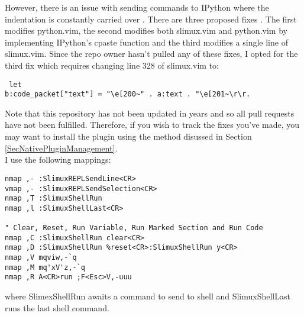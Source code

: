 \documentclass[10pt]{article}
\begin{document}
However, there is an issue with sending commands to IPython where the
indentation is constantly carried over \cite{kmARC2015indentationerror}. There
are three proposed fixes
\cite{lotabout2017remove,karadaharu2016add,zcesur2018fix}. The first modifies
python.vim, the second modifies both slimux.vim and python.vim by implementing
IPython's cpaste function and the third modifies a single line of slimux.vim.
Since the repo owner hasn't pulled any of these fixes, I opted for the third fix
which requires changing line 328 of slimux.vim to: 
\begin{lstlisting} let
b:code_packet["text"] = "\e[200~" . a:text . "\e[201~\r\r.  
\end{lstlisting}
Note that this repository has not been updated in years and so all pull requests
have not been fulfilled. Therefore, if you wish to track the fixes you've made,
you may want to install the plugin using the method disussed in Section
\ref{SecNativePluginManagement}.\\

I use the following mappings:
\begin{lstlisting}
nmap ,- :SlimuxREPLSendLine<CR>
vmap ,- :SlimuxREPLSendSelection<CR>
nmap ,T :SlimuxShellRun 
nmap ,l :SlimuxShellLast<CR>

" Clear, Reset, Run Variable, Run Marked Section and Run Code
nmap ,C :SlimuxShellRun clear<CR>
nmap ,D :SlimuxShellRun %reset<CR>:SlimuxShellRun y<CR>
nmap ,V mqviw,-`q
nmap ,M mq'xV'z,-`q
nmap ,R A<CR>run ;F<Esc>V,-uuu
\end{lstlisting}
where SlimexShellRun awaits a command to send to shell and SlimuxShellLast runs
the last shell command. 

\end{document}
